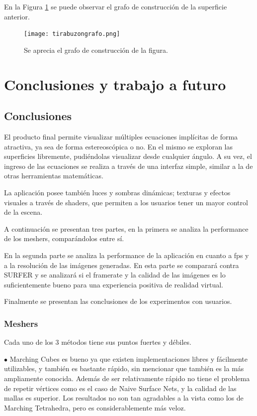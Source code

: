 \documentclass[12pt]{article}
\begin{document}
En la Figura \ref{grafobz} se puede observar el grafo de construcción de la superficie anterior. 
\begin{figure}[h!]
\texttt{[image: tirabuzongrafo.png]}
\caption{Se aprecia el grafo de construcción de la figura.}
\label{grafobz}
\end{figure}
\clearpage
\null\newpage
\section{Conclusiones y trabajo a futuro}
\subsection{Conclusiones}
\noindent El producto final permite visualizar múltiples ecuaciones implícitas de forma atractiva, ya sea de forma estereoscópica o no. En el mismo se exploran las superficies libremente, pudiéndolas visualizar desde cualquier ángulo. A su vez, el ingreso de las ecuaciones se realiza a través de una interfaz simple, similar a la de otras herramientas matemáticas. 

La aplicación posee también luces y sombras dinámicas; texturas y efectos visuales a través de shaders, que permiten a los usuarios tener un mayor control de la escena.

A continuación se presentan tres partes, en la primera se analiza la performance de los meshers, comparándolos entre sí. 

En la segunda parte se analiza la performance de la aplicación en cuanto a fps y a la resolución de las imágenes generadas. En esta parte se comparará contra SURFER y se analizará si el framerate y la calidad de las imágenes es lo suficientemente bueno para una experiencia positiva de realidad virtual.

Finalmente se presentan las conclusiones de los experimentos con usuarios.
\subsubsection{Meshers}
\noindent Cada uno de los 3 métodos tiene sus puntos fuertes y débiles. 

$\bullet$ Marching Cubes es bueno ya que existen implementaciones libres y fácilmente utilizables, y también es bastante rápido, sin mencionar que también es la más ampliamente conocida. Además de ser relativamente rápido no tiene el problema de repetir vértices como es el caso de Naive Surface Nets, y la calidad de las mallas es superior. Los resultados no son tan agradables a la vista como los de Marching Tetrahedra, pero es considerablemente más veloz. 
\end{document}
